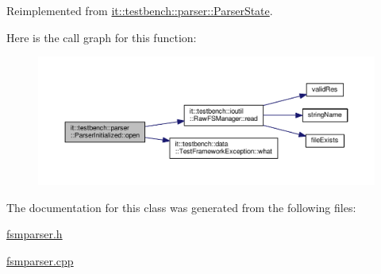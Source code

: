 Reimplemented from \hyperlink{classit_1_1testbench_1_1parser_1_1ParserState_a3ec7b3cd79f7725c702fd2b081e756de}{it\-::testbench\-::parser\-::\-Parser\-State}.



Here is the call graph for this function\-:
\nopagebreak
\begin{figure}[H]
\begin{center}
\leavevmode
\includegraphics[width=350pt]{d2/d1e/classit_1_1testbench_1_1parser_1_1ParserInitialized_a4c5e395ca0be2a58cf6351d30f69e3be_cgraph}
\end{center}
\end{figure}




The documentation for this class was generated from the following files\-:\begin{DoxyCompactItemize}
\item 
\hyperlink{fsmparser_8h}{fsmparser.\-h}\item 
\hyperlink{fsmparser_8cpp}{fsmparser.\-cpp}\end{DoxyCompactItemize}
